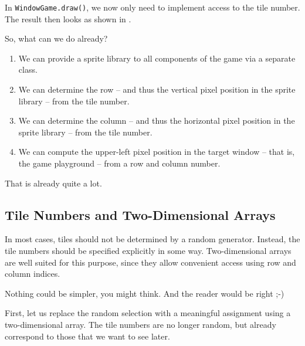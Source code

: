 
In \texttt{WindowGame.draw()}, we now only need to implement access to the tile number. The result then looks as shown in .




So, what can we do already?
\begin{enumerate}
	\item We can provide a sprite library to all components of the game via a separate class.
	\item We can determine the row -- and thus the vertical pixel position in the sprite library -- from the tile number.
	\item We can determine the column -- and thus the horizontal pixel position in the sprite library -- from the tile number.
	\item We can compute the upper-left pixel position in the target window -- that is, the game playground -- from a row and column number.
\end{enumerate}

That is already quite a lot.

\subsection{Tile Numbers and Two-Dimensional Arrays}

In most cases, tiles should not be determined by a random generator. Instead, the tile numbers should be specified explicitly in some way. Two-dimensional arrays are well suited for this purpose, since they allow convenient access using row and column indices.

Nothing could be simpler, you might think. And the reader would be right ;-)

First, let us replace the random selection with a meaningful assignment using a two-dimensional array. The tile numbers are no longer random, but already correspond to those that we want to see later.


